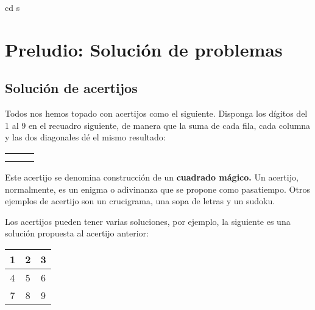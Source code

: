 cd s
\chapter{Preludio: Solución de problemas}


\section{Solución de acertijos}


Todos nos hemos topado con acertijos como el siguiente. Disponga los
dígitos del 1 al 9 en el recuadro siguiente, de manera que la suma
de cada fila, cada columna y las dos diagonales dé el mismo resultado:

\begin{center}
\begin{tabular}{|c|c|c|}
\hline 
 &  & \tabularnewline
\hline 
 &  & \tabularnewline
\hline 
 &  & \tabularnewline
\hline 
\end{tabular}
\par\end{center}

Este acertijo se denomina construcción de un \textbf{cuadrado mágico.
}Un acertijo, normalmente, es un enigma o adivinanza que se propone
como pasatiempo. Otros ejemplos de acertijo son un crucigrama, una
sopa de letras y un sudoku.

Los acertijos pueden tener varias soluciones, por ejemplo, la siguiente
es una solución propuesta al acertijo anterior:

\begin{center}
\begin{tabular}{|c|c|c|}
\hline 
1  & 2  & 3\tabularnewline
\hline 
4  & 5  & 6\tabularnewline
\hline 
7  & 8  & 9 \tabularnewline
\hline 
\end{tabular}
\par\end{center}

